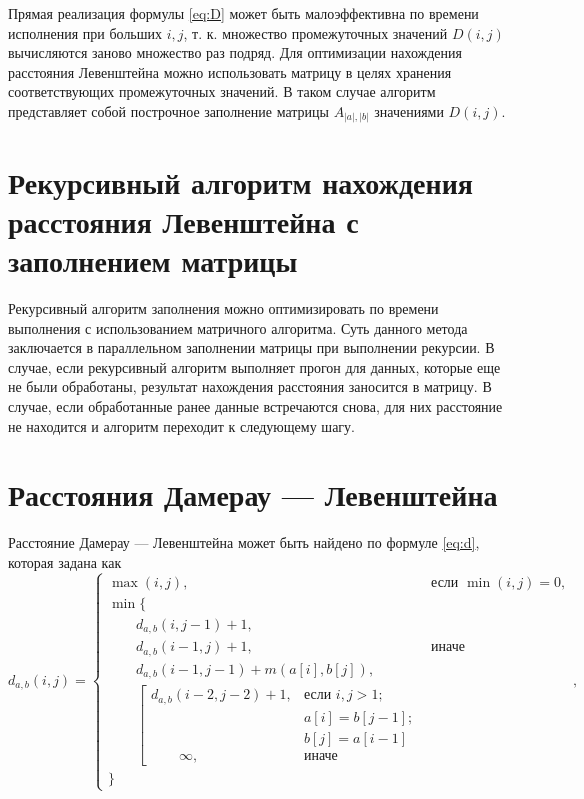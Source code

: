 Прямая реализация формулы \ref{eq:D} может быть малоэффективна по времени исполнения при больших $i, j$, т. к. множество промежуточных значений $D(i, j)$ вычисляются заново множество раз подряд. Для оптимизации нахождения расстояния Левенштейна можно использовать матрицу в целях хранения соответствующих промежуточных значений. В таком случае алгоритм представляет собой построчное заполнение матрицы 
$A_{|a|,|b|}$ значениями $D(i, j)$.

\section{Рекурсивный алгоритм нахождения расстояния Левенштейна с заполнением матрицы}
\label{sec:recmat}

Рекурсивный алгоритм заполнения можно оптимизировать по времени выполнения с использованием матричного алгоритма. Суть данного метода заключается в параллельном заполнении матрицы при выполнении рекурсии. В случае, если рекурсивный алгоритм выполняет прогон для данных, которые еще не были обработаны, результат нахождения расстояния заносится в матрицу. В случае, если обработанные ранее данные встречаются снова, для них расстояние не находится и алгоритм переходит к следующему шагу.

\section{Расстояния Дамерау — Левенштейна}

Расстояние Дамерау — Левенштейна может быть найдено по формуле \ref{eq:d}, которая задана как
\begin{equation}
	\label{eq:d}
	d_{a,b}(i, j) = \begin{cases}
		\max(i, j), &\text{если }\min(i, j) = 0,\\
		\min \lbrace \\
			\qquad d_{a,b}(i, j-1) + 1,\\
			\qquad d_{a,b}(i-1, j) + 1, &\text{иначе}\\
			\qquad d_{a,b}(i-1, j-1) + m(a[i], b[j]),\\
			\qquad \left[ \begin{array}{cc}d_{a,b}(i-2, j-2) + 1, &\text{если }i,j > 1;\\
			\qquad &\text{}a[i] = b[j-1]; \\
			\qquad &\text{}b[j] = a[i-1]\\
			\qquad \infty, & \text{иначе}\end{array}\right.\\
		\rbrace
		\end{cases},
\end{equation}

